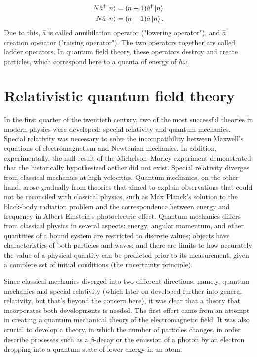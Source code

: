 \begin{equation}
\begin{split}
N\hat{a}^\dagger \ket{n} &= (n+1)\hat{a}^\dagger\ket{n} \\
N\hat{a}\ket{n} &= (n-1)\hat{a}\ket{n}.
\end{split}
\end{equation}
Due to this, $\hat{a}$ is called annihilation operator ("lowering operator"), and $\hat{a}^\dagger$ creation operator ("raising operator"). The two operators together are called ladder operators. In quantum field theory, these operators destroy and create particles, which correspond here to a quanta of energy of $\hbar\omega$.

\section{Relativistic quantum field theory}
\label{sec:rqft}

In the first quarter of the twentieth century, two of the most successful theories in modern physics were developed: special relativity and quantum mechanics. Special relativity was necessary to solve the incompatibility between Maxwell's equations of electromagnetism and Newtonian mechanics. In addition, experimentally, the null result of the Michelson–Morley experiment demonstrated that the historically hypothesized aether did not exist. Special relativity diverges from classical mechanics at high-velocities. Quantum mechanics, on the other hand, arose gradually from theories that aimed to explain observations that could not be reconciled with classical physics, such as Max Planck's solution to the black-body radiation problem and the correspondence between energy and frequency in Albert Einstein's photoelectric effect. Quantum mechanics differs from classical physics in several aspects: energy, angular momentum, and other quantities of a bound system are restricted to discrete values; objects have characteristics of both particles and waves; and there are limits to how accurately the value of a physical quantity can be predicted prior to its measurement, given a complete set of initial conditions (the uncertainty principle).

Since classical mechanics diverged into two different directions, namely, quantum mechanics and special relativity (which later on developed further into general relativity, but that's beyond the concern here), it was clear that a theory that incorporates both developments is needed. The first effort came from an attempt in creating a quantum mechanical theory of the electromagnetic field. It was also crucial to develop a theory, in which the number of particles changes, in order describe processes such as a $\beta$-decay or the emission of a photon by an electron dropping into a quantum state of lower energy in an atom.

